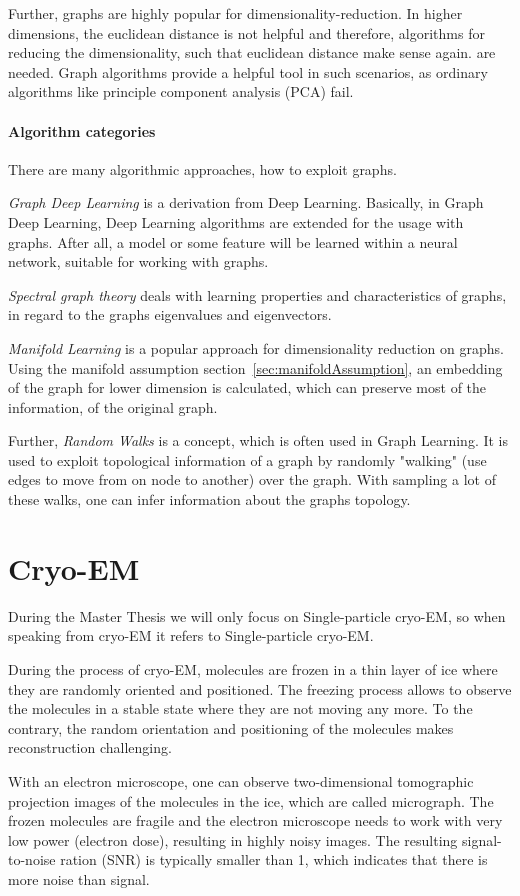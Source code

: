 Further, graphs are highly popular for dimensionality-reduction. In higher dimensions, the euclidean distance is not helpful and therefore,
algorithms for reducing the dimensionality, such that euclidean distance make sense again. are needed. 
Graph algorithms provide a helpful tool in such scenarios, as ordinary algorithms like principle component analysis (PCA) fail.

\paragraph{Algorithm categories}

There are many algorithmic approaches, how to exploit graphs. 

\textit{Graph Deep Learning} is a derivation from Deep Learning. 
Basically, in Graph Deep Learning, Deep Learning algorithms are extended for the usage with graphs.
After all, a model or some feature will be learned within a neural network, suitable for working with graphs.

\textit{Spectral graph theory}\cite{SpectralGraphTheory} deals with learning properties and characteristics of graphs, in regard to
the graphs eigenvalues and eigenvectors. 

\textit{Manifold Learning }\cite{ManifoldLearning} is a popular approach for dimensionality reduction on graphs. 
Using the manifold assumption section~\ref{sec:manifoldAssumption}, an embedding of the graph for lower dimension is calculated,
which can preserve most of the information, of the original graph.

Further, \textit{Random Walks} is a concept, which is often used in Graph Learning. 
It is used to exploit topological information of a graph by randomly "walking" (use edges to move from on node to another)
over the graph. With sampling a lot of these walks, one can infer information about the graphs topology.


\section{Cryo-EM}
During the Master Thesis we will only focus on Single-particle cryo-EM, so when speaking from cryo-EM
it refers to Single-particle cryo-EM.

During the process of cryo-EM, molecules are frozen in a thin layer of ice
where they are randomly oriented and positioned. 
The freezing process allows to observe the molecules in a stable state where they are not moving any more.
To the contrary, the random orientation and positioning of the molecules makes reconstruction challenging\cite{singleParticleCryoEm}.

With an electron microscope, one can observe two-dimensional tomographic projection images of the molecules in the ice,
which are called micrograph. The frozen molecules are fragile and the electron microscope needs to work with
very low power (electron dose), resulting in highly noisy images. The resulting signal-to-noise ration (SNR)
is typically smaller than 1, which indicates that there is more noise than signal\cite{cryoEmMath2}.





